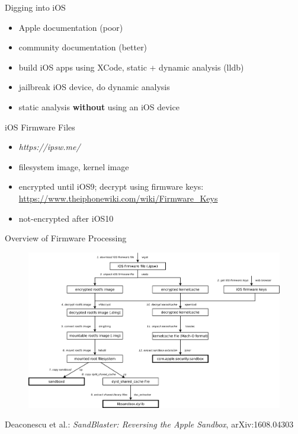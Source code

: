 \documentclass{beamer}
\begin{document}
\begin{frame}{Digging into iOS}
  \begin{itemize}
    \pause \item Apple documentation (poor)
    \pause \item community documentation (better)
    \pause \item build iOS apps using XCode, static + dynamic analysis (lldb)
    \pause \item jailbreak iOS device, do dynamic analysis
    \pause \item static analysis \textbf{without} using an iOS device
  \end{itemize}
\end{frame}

\begin{frame}{iOS Firmware Files}
  \begin{itemize}
    \item \textit{https://ipsw.me/}
    \item filesystem image, kernel image
    \item encrypted until iOS9; decrypt using firmware keys: \url{https://www.theiphonewiki.com/wiki/Firmware_Keys}
    \item not-encrypted after iOS10
  \end{itemize}
\end{frame}

\begin{frame}{Overview of Firmware Processing}
  \begin{figure}
    \centering
    \includegraphics[width=\textwidth]{img/extract-required-files}
  \end{figure}
  \vspace{0.2cm}
  \centering
  \footnotesize{Deaconescu et al.: \textit{SandBlaster: Reversing the Apple Sandbox}, arXiv:1608.04303}
\end{frame}
\end{document}

